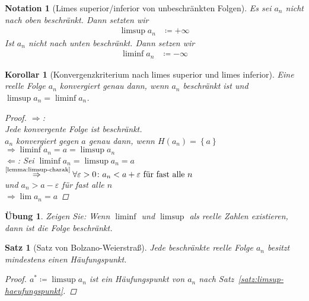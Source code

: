 \documentclass[11pt, twoside, a4paper]{article}
\theoremstyle{plain}
\newtheorem{satz}[blockelement]{Satz}
\newtheorem{notation}[blockelement]{Notation}
\newtheorem{korollar}[blockelement]{Korollar}
\newtheorem{uebung}[blockelement]{Übung}
\newcommand{\set}[1]{\left\{#1\right\}}
\newcommand{\impl}[0]{\Rightarrow{}}
\newcommand{\definedas}[0]{\coloneqq}
\newcommand{\annot}[2]{\overset{\text{#2}}{#1}}
\newcommand{\anf}[1]{\glqq{}#1\grqq}
\begin{document}
    \begin{notation}[Limes superior/inferior von unbeschränkten Folgen]
        Es sei $a_n$ nicht nach oben beschränkt. Dann setzten wir
        \begin{align*}
            \limsup a_n &\definedas +\infty
        \end{align*}
        Ist $a_n$ nicht nach unten beschränkt. Dann setzen wir
        \begin{align*}
            \liminf a_n &\definedas -\infty
        \end{align*}
    \end{notation}

    \begin{korollar}[Konvergenzkriterium nach limes superior und limes inferior]
        Eine reelle Folge $a_n$ konvergiert genau dann, wenn $a_n$ beschränkt ist und $\limsup a_n = \liminf a_n$.
        \begin{proof}
            \anf{$\impl$}:\\
            Jede konvergente Folge ist beschränkt.\\
            $a_n$ konvergiert gegen $a$ genau dann, wenn $H(a_n) = \set{a}$\\
            $\impl \liminf a_n = a = \limsup a_n$\\[10pt]
            \anf{$\Leftarrow$}: Sei $\liminf a_n = \limsup a_n = a$\\
            $\annot{\impl}{\ref{lemma:limsup-charak}} \forall \varepsilon > 0\colon a_n < a+\varepsilon \text{ für fast alle $n$}$\\
            und $a_n > a-\varepsilon $ für fast alle $n$\\
            $\impl \lim a_n = a$\qedhere
        \end{proof}
    \end{korollar}

    \begin{uebung}
        Zeigen Sie: Wenn $\liminf$ und $\limsup$ als reelle Zahlen existieren, dann ist die Folge beschränkt.
    \end{uebung}

    \begin{satz}[Satz von Bolzano-Weierstraß] %
        \label{satz:bolzano-weierstrass}
        Jede beschränkte reelle Folge $a_n$ besitzt mindestens einen Häufungspunkt.

        \begin{proof}
            $a^* \definedas \limsup a_n$ ist ein Häufungspunkt von $a_n$ nach Satz~\ref{satz:limsup-haeufungspunkt}.
        \end{proof}
    \end{satz}
\end{document}
